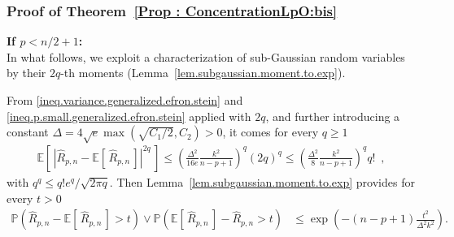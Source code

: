 \documentclass[twoside,11pt]{article}
\numberwithin{equation}{section}
\newcommand{\prob}[1]{\mathbb{P}\left(#1 \right)}
\newcommand{\gp}[1]{\left(#1\right)}
\newcommand{\1}{\mathds{1}}%
\newcommand{\paren}[1]{\left( #1 \right)}
\newcommand{\croch}[1]{\left[\, #1 \,\right]}
\newcommand{\abs}[1]{\left\lvert #1 \right\rvert} %
\newcommand{\E}{\mathbb{E}}
\newcommand{\Rh}{\widehat{R}}
\numberwithin{equation}{section}
\theoremstyle{plain}
\begin{document}
%
%

\subsubsection{Proof of Theorem~\ref{Prop : ConcentrationLpO:bis}}

\noindent\textbf{If $p< n/2+1$:}
~\\
%
In what follows, we exploit a characterization of sub-Gaussian random variables by their $2q$-th moments (Lemma~\ref{lem.subgaussian.moment.to.exp}).

\medskip

%
\sloppy
From \eqref{ineq.variance.generalized.efron.stein} and \eqref{ineq.p.small.generalized.efron.stein} applied with $2q$, and further introducing a constant $\Delta = 4 \sqrt{e}\max\paren{ \sqrt{C_1/2} , C_2 }>0$, it comes for every $q\geq 1$
\begin{align}\label{ineq.moments.2q}
\E\croch{ \abs{ \Rh_{p,n} - \E\croch{\Rh_{p,n}} }^{2q} } \leq \paren{ \frac{\Delta^2}{16 e}  \frac{k^2}{n-p+1} }^q  (2q)^{q} \leq \paren{  \frac{\Delta^2}{8}  \frac{k^2}{n-p+1} }^q   q! \enspace,
\end{align}
with $q^q \leq q! e^q/\sqrt{2\pi q} $.
%
Then Lemma~\ref{lem.subgaussian.moment.to.exp} provides for every $t>0$
\begin{align*}
 \prob{ \Rh_{p,n} - \E\croch{\Rh_{p,n}} >t }  \vee  \prob{ \E\croch{\Rh_{p,n}} - \Rh_{p,n} >t }
&\leq \exp\paren{- (n-p+1) \frac{t^2}{ \Delta^2  k^2 } } .
\end{align*}
\end{document}
